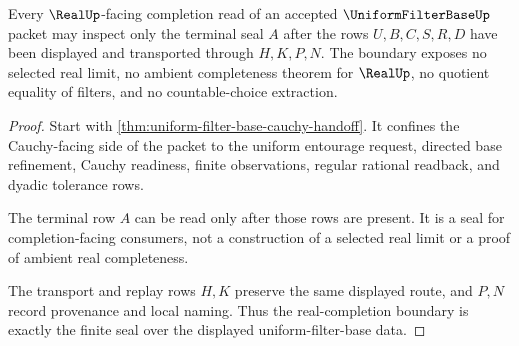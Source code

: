 \begin{theorem}
\label{thm:uniform-filter-base-real-completion-boundary}
Every $\RealUp$-facing completion read of an accepted $\UniformFilterBaseUp$ packet may inspect only the terminal seal $A$ after the rows $U,B,C,S,R,D$ have been displayed and transported through $H,K,P,N$. The boundary exposes no selected real limit, no ambient completeness theorem for $\RealUp$, no quotient equality of filters, and no countable-choice extraction.
\end{theorem}
\begin{proof}
Start with \autoref{thm:uniform-filter-base-cauchy-handoff}. It confines the Cauchy-facing side of the packet to the uniform entourage request, directed base refinement, Cauchy readiness, finite observations, regular rational readback, and dyadic tolerance rows.

The terminal row $A$ can be read only after those rows are present. It is a seal for completion-facing consumers, not a construction of a selected real limit or a proof of ambient real completeness.

The transport and replay rows $H,K$ preserve the same displayed route, and $P,N$ record provenance and local naming. Thus the real-completion boundary is exactly the finite seal over the displayed uniform-filter-base data.
\end{proof}


\begin{closurestatus}{\UniformFilterBaseUp}
  \theoryclosure{\seedClosure}
  \formalstatus{\unformalizedV}
\end{closurestatus}
